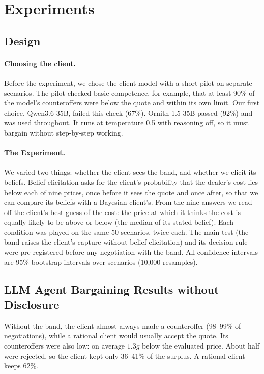 \documentclass[sigconf]{acmart}
\begin{document}
\section{Experiments}

\subsection{Design}

\paragraph{Choosing the client.}
Before the experiment, we chose the client model with a short pilot on separate scenarios. The pilot checked basic competence, for example, that at least 90\% of the model's counteroffers were below the quote and within its own limit. Our first choice, Qwen3.6-35B, failed this check (67\%). Ornith-1.5-35B passed (92\%) and was used throughout. It runs at temperature 0.5 with reasoning off, so it must bargain without step-by-step working.
\paragraph{The Experiment.}
We varied two things: whether the client sees the band, and whether we elicit its beliefs. Belief elicitation asks for the client's probability that the dealer's cost lies below each of nine prices, once before it sees the quote and once after, so that we can compare its beliefs with a Bayesian client's. From the nine answers we read off the client's best guess of the cost: the price at which it thinks the cost is equally likely to be above or below (the median of its stated belief). Each condition was played on the same 50 scenarios, twice each. The main test (the band raises the client's capture without belief elicitation) and its decision rule were pre-registered before any negotiation with the band. All confidence intervals are 95\% bootstrap intervals over scenarios (10,000 resamples). 


\subsection{LLM Agent Bargaining Results without Disclosure}

Without the band, the client almost always made a counteroffer (98--99\% of negotiations), while a rational client would usually accept the quote. Its counteroffers were also low: on average $1.3g$ below the evaluated price. About half were rejected, so the client kept only 36--41\% of the surplus. A rational client keeps 62\%.
\end{document}
